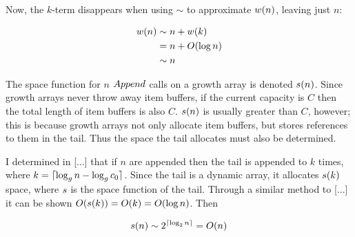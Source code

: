 Now, the $k$-term disappears when using $\sim$ to approximate $w(n)$, leaving just $n$:

\begin{align*}
w(n) &\sim n + w(k)\\
&= n + O(\log n)\\
&\sim n
\end{align*}

\HdrSpaceComplex

The space function for $n$ $Append$ calls on a growth array is denoted $s(n)$. Since growth arrays never throw away item buffers, if the current capacity is $C$ then the total length of item buffers is also $C$. $s(n)$ is usually greater than $C$, however; this is because growth arrays not only allocate item buffers, but stores references to them in the tail. Thus the space the tail allocates must also be determined.

I determined in [...] that if $n$ are appended then the tail is appended to $k$ times, where $k = \lceil \log_{g} n - \log_{g} c_0 \rceil$. Since the tail is a dynamic array, it allocates $s(k)$ space, where $s$ is the space function of the tail. Through a similar method to [...] it can be shown $O(s(k)) = O(k) = O(\log n)$. Then %

\begin{align*}
s(n) \sim 2^{\lceil \log_2 n \rceil} = O(n)
\end{align*}